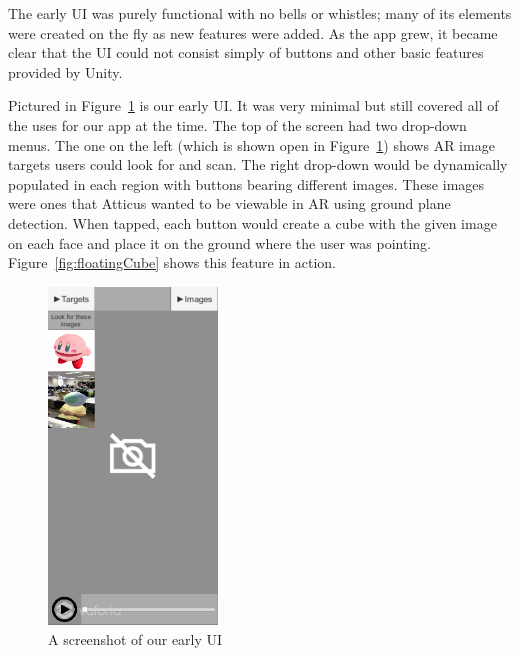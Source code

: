 \documentclass[a4paper, 10pt, american, titlepage]{article}
\begin{document}
The early UI was purely functional with no bells or whistles; many of its
elements were created on the fly as new features were added. As the app grew,
it became clear that the UI could not consist simply of buttons and other basic
features provided by Unity.

Pictured in Figure~\ref{fig:oldUI} is our early UI. It was very minimal but
still covered all of the uses for our app at the time. The top of the screen had
two drop-down menus. The one on the left (which is shown open in
Figure~\ref{fig:oldUI}) shows AR image targets users could look for and scan.
The right drop-down would be dynamically populated in each region with buttons
bearing different images. These images were ones that Atticus wanted to be
viewable in AR using ground plane detection. When tapped, each button would
create a cube with the given image on each face and place it on the ground
where the user was pointing. Figure~\ref{fig:floatingCube} shows this feature in
action.

\begin{figure}[h]
	\centering
	\includegraphics[width=0.4\textwidth]{old-ui.png}
	\caption{A screenshot of our early UI}
	\label{fig:oldUI}
\end{figure}
\end{document}
